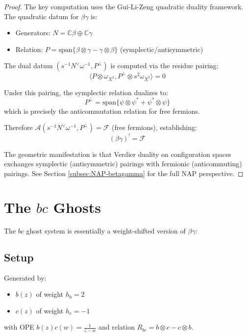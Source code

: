 \begin{proof}
The key computation uses the Gui-Li-Zeng quadratic duality framework. The quadratic datum for $\beta\gamma$ is:
\begin{itemize}
\item Generators: $N = \mathbb{C}\beta \oplus \mathbb{C}\gamma$ 
\item Relation: $P = \text{span}\{\beta \otimes \gamma - \gamma \otimes \beta\}$ (symplectic/antisymmetric)
\end{itemize}

The dual datum $(s^{-1}N^\vee\omega^{-1}, P^\perp)$ is computed via the residue pairing:
$$\langle P \otimes \omega_{X^2}, P^\perp \otimes s^2\omega_{X^2}\rangle = 0$$

Under this pairing, the symplectic relation dualizes to:
$$P^\perp = \text{span}\{\psi \otimes \psi^* + \psi^* \otimes \psi\}$$
which is precisely the anticommutation relation for free fermions.

Therefore $\mathcal{A}(s^{-1}N^\vee\omega^{-1}, P^\perp) = \mathcal{F}$ (free fermions), establishing:
$$(\beta\gamma)^! = \mathcal{F}$$

The geometric manifestation is that Verdier duality on configuration spaces exchanges symplectic (antisymmetric) pairings with fermionic (anticommuting) pairings. See Section \ref{subsec:NAP-betagamma} for the full NAP perspective.
\end{proof}
 
\section{The $bc$ Ghosts}
 
The $bc$ ghost system is essentially a weight-shifted version of $\beta\gamma$:
 
\subsection{Setup}
 
\begin{definition}
Generated by:
\begin{itemize}
\item $b(z)$ of weight $h_b = 2$
\item $c(z)$ of weight $h_c = -1$
\end{itemize}
with OPE $b(z)c(w) = \frac{1}{z-w}$ and relation $R_{bc} = b \otimes c - c \otimes b$.
\end{definition}
 

